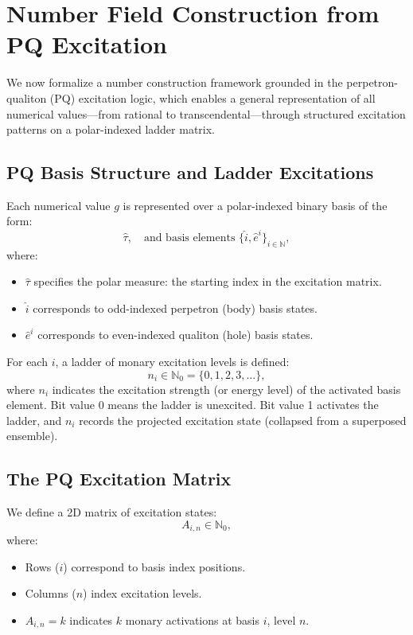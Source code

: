 \documentclass{article}
\begin{document}
\section{Number Field Construction from PQ Excitation}

We now formalize a number construction framework grounded in the perpetron-qualiton (PQ) excitation logic, which enables a general representation of all numerical values---from rational to transcendental---through structured excitation patterns on a polar-indexed ladder matrix.

\subsection{PQ Basis Structure and Ladder Excitations}

Each numerical value $g$ is represented over a polar-indexed binary basis of the form:
\begin{equation}
\hat{\tau}, \quad \text{and basis elements } \{\hat{i}, \hat{e}^i\}_{i \in \mathbb{N}},
\end{equation}
where:
\begin{itemize}
    \item $\hat{\tau}$ specifies the polar measure: the starting index in the excitation matrix.
    \item $\hat{i}$ corresponds to odd-indexed perpetron (body) basis states.
    \item $\hat{e}^i$ corresponds to even-indexed qualiton (hole) basis states.
\end{itemize}

For each $i$, a ladder of monary excitation levels is defined:
\begin{equation}
    n_i \in \mathbb{N}_0 = \{0, 1, 2, 3, \ldots\},
\end{equation}
where $n_i$ indicates the excitation strength (or energy level) of the activated basis element. Bit value 0 means the ladder is unexcited. Bit value 1 activates the ladder, and $n_i$ records the projected excitation state (collapsed from a superposed ensemble).

\subsection{The PQ Excitation Matrix}
We define a 2D matrix of excitation states:
\begin{equation}
    A_{i,n} \in \mathbb{N}_0,
\end{equation}
where:
\begin{itemize}
    \item Rows ($i$) correspond to basis index positions.
    \item Columns ($n$) index excitation levels.
    \item $A_{i,n} = k$ indicates $k$ monary activations at basis $i$, level $n$.
\end{itemize}
\end{document}
